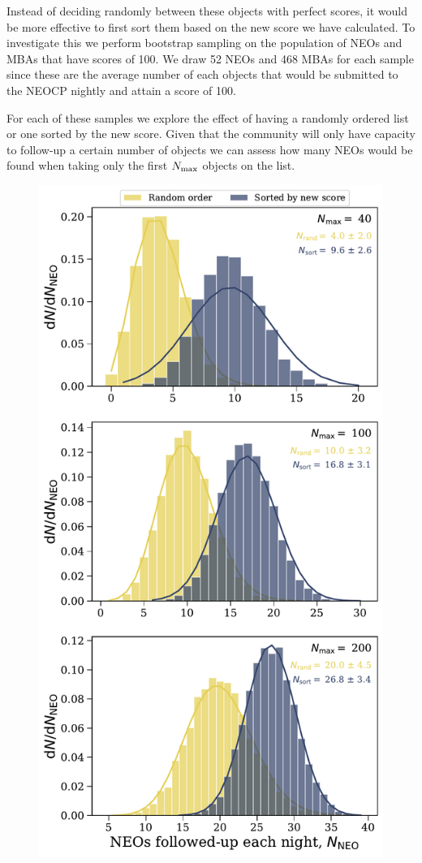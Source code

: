 \documentclass[twocolumn, twocolappendix]{aastex631}
\begin{document}
Instead of deciding randomly between these objects with perfect scores, it would be more effective to first sort them based on the new score we have calculated. To investigate this we perform bootstrap sampling on the population of NEOs and MBAs that have scores of 100. We draw 52 NEOs and 468 MBAs for each sample since these are the average number of each objects that would be submitted to the NEOCP nightly and attain a score of 100.

For each of these samples we explore the effect of having a randomly ordered list or one sorted by the new score. Given that the community will only have capacity to follow-up a certain number of objects we can assess how many NEOs would be found when taking only the first $N_{\rm max}$ objects on the list.

\begin{figure}[htb]
    \centering
    \includegraphics[width=\columnwidth]{sorting_benefits.pdf}

\end{figure}
\end{document}
